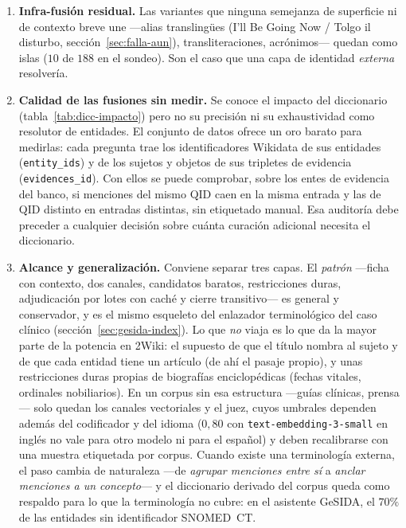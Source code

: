 \documentclass[11pt,a4paper]{article}
\begin{document}
\begin{enumerate}[leftmargin=1.6em, itemsep=1pt]
  vecinas se consume en parejas que luego se excluyen (véase el paso~2).
  Un rediseño debería construir la descripción solo con las frases en que
  la mención es sujeto u objeto y excluir el mismo pasaje \emph{antes} de
  tomar las vecinas.
\item \textbf{Infra-fusión residual.} Las variantes que ninguna semejanza
  de superficie ni de contexto breve une ---alias translingües (\guillemotleft{}I'll Be
  Going Now\guillemotright{} / \guillemotleft{}Tolgo il disturbo\guillemotright{}, sección~\ref{sec:falla-aun}),
  transliteraciones, acrónimos--- quedan como islas ($10$ de $188$ en el
  sondeo). Son el caso que una capa de identidad \emph{externa} resolvería.
\item \textbf{Calidad de las fusiones sin medir.} Se conoce el impacto
  del diccionario (tabla~\ref{tab:dicc-impacto}) pero no su precisión ni su
  exhaustividad como resolutor de entidades. El conjunto de datos ofrece
  un oro barato para medirlas: cada pregunta trae los identificadores
  Wikidata de sus entidades (\texttt{entity\_ids}) y de los sujetos y
  objetos de sus tripletes de evidencia (\texttt{evidences\_id}). Con ellos
  se puede comprobar, sobre los entes de evidencia del banco, si menciones
  del mismo QID caen en la misma entrada y las de QID distinto en entradas
  distintas, sin etiquetado manual. Esa auditoría debe preceder a cualquier
  decisión sobre cuánta curación adicional necesita el diccionario.
\item \textbf{Alcance y generalización.} Conviene separar tres capas. El
  \emph{patrón} ---ficha con contexto, dos canales, candidatos baratos,
  restricciones duras, adjudicación por lotes con caché y cierre
  transitivo--- es general y conservador, y es el mismo esqueleto del
  enlazador terminológico del caso clínico (sección~\ref{sec:gesida-index}).
  Lo que \emph{no} viaja es lo que da la mayor parte de la potencia en
  2Wiki: el supuesto de que el título nombra al sujeto y de que cada
  entidad tiene un artículo (de ahí el pasaje propio), y unas restricciones
  duras propias de biografías enciclopédicas (fechas vitales, ordinales
  nobiliarios). En un corpus sin esa estructura ---guías clínicas,
  prensa--- solo quedan los canales vectoriales y el juez, cuyos umbrales
  dependen además del codificador y del idioma ($0{,}80$ con
  \texttt{text-embedding-3-small} en inglés no vale para otro modelo ni
  para el español) y deben recalibrarse con una muestra etiquetada por
  corpus. Cuando existe una terminología externa, el paso cambia de
  naturaleza ---de \emph{agrupar menciones entre sí} a \emph{anclar
  menciones a un concepto}--- y el diccionario derivado del corpus queda
  como respaldo para lo que la terminología no cubre: en el asistente
  GeSIDA, el $70\%$ de las entidades sin identificador SNOMED~CT.
\end{enumerate}
\end{document}
